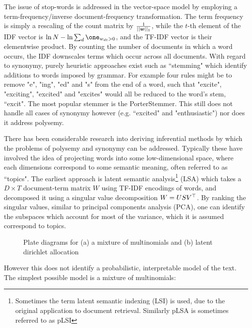 The issue of stop-words is addressed in the vector-space model by employing a term-frequency/inverse document-frequency transformation. The term frequency is simply a rescaling of the count matrix by $\frac{1}{||\bm w||_1}$, while the $t$-th element of the IDF vector is $\ln N - \ln \sum_d \one_{w_{dt} > 0}$, and the TF-IDF vector is their elementwise product. By counting the number of documents in which a word occurs, the IDF downscales terms which occur across all documents. With regard to synonymy, purely heuristic approaches exist such as ``stemming" which identify additions to words imposed by grammar. For example four rules might be to remove "e", "ing", "ed" and "s" from the end of a word, such that "excite", "exciting", "excited" and "excites" would all be reduced to the word's stem, ``excit". The most popular stemmer is the PorterStemmer. This still does not handle all cases of synonymy however (e.g. ``excited" and "enthusiastic") nor does it address polysemy.

There has been considerable research into deriving inferential methods by which the problems of polysemy and synonymy can be addressed. Typically these have involved the idea of projecting words into some low-dimensional space, where each dimensions correspond to some semantic meaning, often referred to as ``topics". The earliest approach is latent semantic analysis\footnote{Sometimes the term latent semantic indexing (LSI) is used, due to the original application to document retrieval. Similarly pLSA is sometimes referred to as pLSI} (LSA)\cite{Deerwester1990} which takes a $D\times T$ document-term matrix $W$ using TF-IDF encodings of words, and decomposed it using a singular value decomposition $W = USV^\top$. By ranking the singular values, similar to principal components analysis (PCA), one can identify the subspaces which account for most of the variance, which it is assumed correspond to topics.


\begin{figure}
\centering
    \subfigure[]{
        
    }
    \subfigure[]{
        
    }
    \caption{Plate diagrams for (a) a mixture of multinomials and (b) latent dirichlet allocation}
\label{fig:plates}
\end{figure}
However this does not identify a probabilistic, interpretable model of the text. The simplest possible model is a mixture of multinomials\cite{Nigam2000}:

